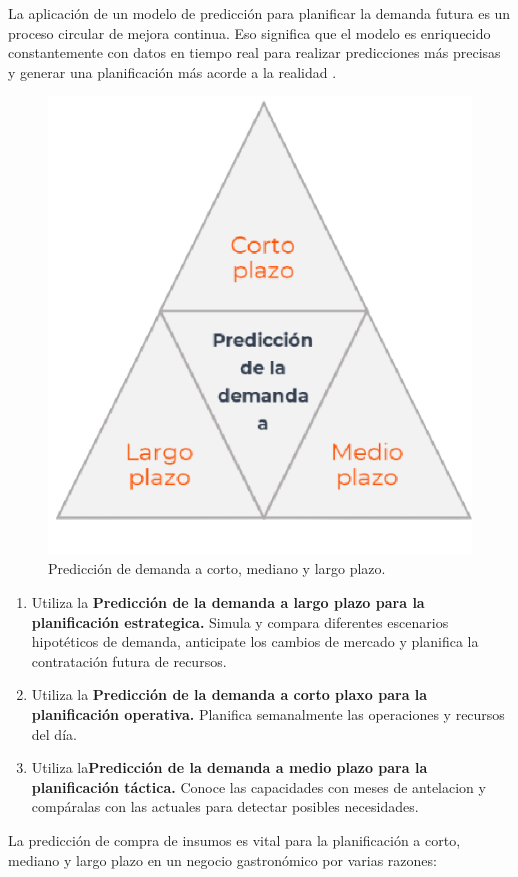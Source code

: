\vspace{1\baselineskip}
La aplicación de un modelo de predicción para planificar la demanda futura es un proceso circular de mejora continua. Eso significa que el modelo es enriquecido constantemente con datos en tiempo real para realizar predicciones más precisas y generar una planificación más acorde a la realidad \cite{decide}.
\begin{figure}[H]
  \begin{center}
    \includegraphics[scale=0.50]{./trianguloCMD.png}
    \caption{Predicción de demanda a corto, mediano y largo plazo\cite{decide}.}
    \label{fig:proceso_inventario}
  \end{center}
\end{figure}

\begin{enumerate}
  \item Utiliza la \textbf{Predicción de la demanda a largo plazo para la planificación estrategica.}
  Simula y compara diferentes escenarios hipotéticos de demanda, anticipate los cambios de mercado y planifica la contratación futura de recursos.
  \item Utiliza la \textbf{Predicción de la demanda a corto plaxo para la planificación operativa.}
  Planifica semanalmente las operaciones y recursos del día.
  \item Utiliza la\textbf{Predicción de la demanda a medio plazo para la planificación táctica.} 
  Conoce las capacidades con meses de antelacion y compáralas con las actuales para detectar posibles necesidades.
\end{enumerate}
\vspace{1\baselineskip}
La predicción de compra de insumos es vital para la planificación a corto, mediano y largo plazo en un negocio gastronómico por varias razones:



